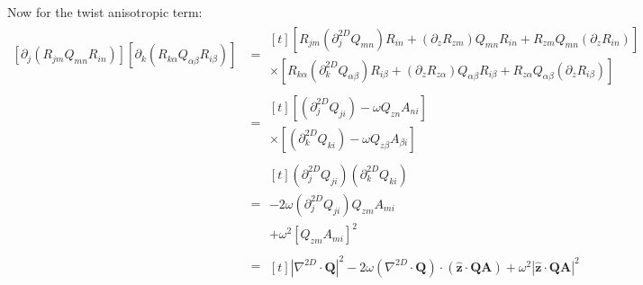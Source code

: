 \documentclass[reqno]{article}
\newcommand{\Q}{\mathbf{Q}}
\newcommand{\A}{\mathbf{A}}
\newcommand{\z}{\mathbf{\hat{z}}}
\begin{document}
Now for the twist anisotropic term:
\begin{equation}
\begin{split}
    \left[ \partial_j (R_{jm} Q_{mn} R_{in}) \right] 
    \left[ \partial_k (R_{k\alpha} Q_{\alpha \beta} R_{i\beta}) \right] 
    &=
    \begin{multlined}[t]
    \left[ 
        R_{jm} (\partial^{2D}_j Q_{m n}) R_{in} 
        + (\partial_z R_{zm}) Q_{m n} R_{in}
        + R_{zm} Q_{m n} (\partial_z R_{in})
    \right] \\
    \times \left[ 
        R_{k\alpha} (\partial^{2D}_k Q_{\alpha \beta}) R_{i\beta} 
        + (\partial_z R_{z\alpha}) Q_{\alpha \beta} R_{i\beta}
        + R_{z\alpha} Q_{\alpha \beta} (\partial_z R_{i\beta})
    \right]
    \end{multlined} \\
    &=
    \begin{multlined}[t]
    \left[ 
        (\partial^{2D}_j Q_{j i})
        - \omega Q_{z n} A_{ni} 
    \right] \\
    \times \left[ 
        (\partial^{2D}_k Q_{k i})
        - \omega Q_{z \beta} A_{\beta i}
    \right]
    \end{multlined} \\
    &=
    \begin{multlined}[t]
        \left( \partial^{2D}_j Q_{ji} \right)\left( \partial^{2D}_k Q_{ki} \right) \\
        - 2 \omega \left( \partial^{2D}_j Q_{ji} \right) Q_{zm} A_{mi}  \\
        + \omega^2 \left[ Q_{zm} A_{mi} \right]^2
    \end{multlined} \\
    &=
    \begin{multlined}[t]
        \left| \nabla^{2D} \cdot \Q \right|^2 
        - 2 \omega \left( \nabla^{2D} \cdot \Q \right) \cdot \left( \z \cdot \Q \A \right) 
        + \omega^2 \left| \z \cdot \Q \A \right|^2
    \end{multlined}
\end{split}
\end{equation}
\end{document}
